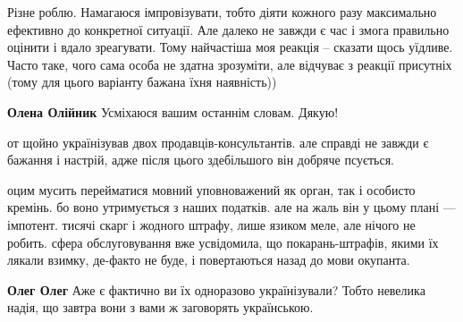\begin{itemize}
Різне роблю. Намагаюся імпровізувати, тобто діяти кожного разу максимально
ефективно до конкретної ситуації. Але далеко не завжди є час і змога правильно
оцінити і вдало зреагувати. Тому найчастіша моя реакція – сказати щось уїдливе.
Часто таке, чого сама особа не здатна зрозуміти, але відчуває з реакції
присутніх (тому для цього варіанту бажана їхня наявність))

\begin{itemize}
 
\textbf{Олена Олійник} Усміхаюся вашим останнім словам. Дякую!
\end{itemize}

 

от щойно українізував двох продавців-консультантів. але справді не завжди є
бажання і настрій, адже після цього здебільшого він добряче псується.

оцим мусить перейматися мовний уповноважений як орган, так і особисто кремінь.
бо воно утримується з наших податків. але на жаль він у цьому плані — імпотент.
тисячі скарг і жодного штрафу, лише язиком меле, але нічого не робить. сфера
обслуговування вже усвідомила, що покарань-штрафів, якими їх лякали взимку,
де-факто не буде, і повертаються назад до мови окупанта.

\begin{itemize}
 
\textbf{Олег Олег} Аже є фактично ви їх одноразово українізували? Тобто невелика надія, що завтра вони з вами ж заговорять українською.

 

\end{itemize}
\end{itemize}
